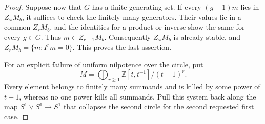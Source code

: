 \begin{proof}
Suppose now that $G$ has a finite generating set. If every
$(g-1)m$ lies in $Z_\omega M_b$, it suffices to check the finitely many
generators. Their values lie in a common $Z_rM_b$, and the identities
for a product or inverse show the same for every $g\in G$.
Thus $m\in Z_{r+1}M_b$. Consequently $Z_\omega M_b$ is already stable,
and $Z_rM_b=\{m:I^rm=0\}$. This proves the last assertion.

For an explicit failure of uniform nilpotence over the circle, put
\[
 M=\bigoplus_{r\ge1}\mathbb Z[t,t^{-1}]/(t-1)^r.
                                                               \tag{E.2.3}
\]
Every element belongs to finitely many summands and is killed by
some power of $t-1$, whereas no one power kills all summands.
Pull this system back along the map $S^1\vee S^1\to S^1$ that
collapses the second circle for the second requested first case.
\end{proof}

